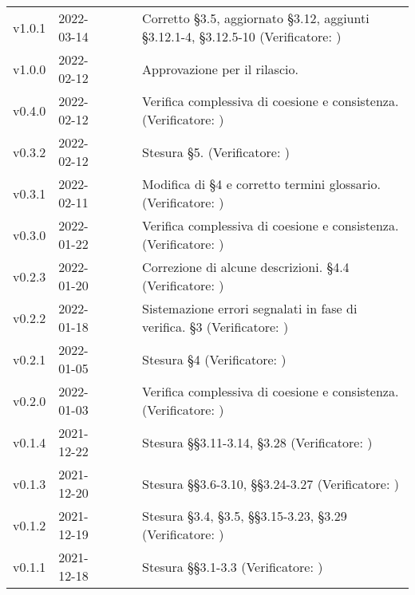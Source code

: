 \begin{longtable}{ m{}<{\centering}  m{}<{\centering}  m{}<{\centering}  m{}<{\centering}  m{}<{\centering} }
	v1.0.1 & 2022-03-14& \GC & \AN{} & Corretto \S{}3.5, aggiornato \S{}3.12, aggiunti \S{}3.12.1-4, \S{}3.12.5-10 (Verificatore: \textit{\PV})  \\
	
	v1.0.0& 2022-02-12& \EP{} &  \RE{}  & Approvazione per il rilascio. \\

	v0.4.0 & 2022-02-12 & \FP{} & \AN{} & Verifica complessiva di coesione e consistenza. (Verificatore: \textit{\MG})\\

	v0.3.2 & 2022-02-12 & \FP{} & \AN{} & Stesura §5. (Verificatore: \textit{\MG})\\

	v0.3.1 & 2022-02-11 & \GC{} & \AN{} & Modifica di \S{}4 e corretto termini glossario. (Verificatore: \textit{\MG})\\
	
	v0.3.0 & 2022-01-22 & \GC{} & \AN{} & Verifica complessiva di coesione e consistenza. (Verificatore: \textit{\MG})\\		
	
	v0.2.3 & 2022-01-20 & \GC{} & \AN{} & Correzione di alcune descrizioni. \S{}4.4 (Verificatore: \textit{\MG})\\

	v0.2.2 & 2022-01-18 & \GC & \AN & Sistemazione errori segnalati in fase di verifica. \S{}3 (Verificatore: \textit{\PV}) \\

	v0.2.1 & 2022-01-05 & \GC{} & \AN{} & Stesura §4 (Verificatore: \textit{\MG})\\	

	v0.2.0 & 2022-01-03 & \LW{} & \AN{} & Verifica complessiva di coesione e consistenza. (Verificatore: \textit{\PV})\\	

	v0.1.4 & 2021-12-22 & \LW{} & \AN{} & Stesura §§3.11-3.14, §3.28 (Verificatore: \textit{\PV})\\	

	v0.1.3 & 2021-12-20 & \FP{} & \AN{} & Stesura §§3.6-3.10, §§3.24-3.27 (Verificatore: \textit{\PV})\\	
	
	v0.1.2 & 2021-12-19 & \GC{} & \AN{} & Stesura §3.4, §3.5, §§3.15-3.23, §3.29 (Verificatore: \textit{\PV})\\	

	v0.1.1 & 2021-12-18 & \FP{} & \AN{} & Stesura §§3.1-3.3 (Verificatore: \textit{\PV})\\	


\end{longtable}
